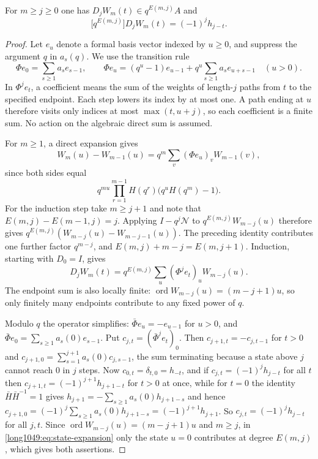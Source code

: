 \begin{lemma}\label{long1049:res:allrowinitial}
For $m\ge j\ge0$ one has $D_jW_m(t)\in q^{E(m,j)}A$ and
\[
 \bigl[q^{E(m,j)}\bigr]D_jW_m(t)=(-1)^{j}h_{j-t}.
\]
\end{lemma}

\begin{proof}
Let $e_u$ denote a formal basis vector indexed by $u\ge0$, and suppress
the argument $q$ in $a_s(q)$. We use the transition rule
\[
 \Phi e_0=\sum_{s\ge1}a_se_{s-1},
 \qquad
 \Phi e_u=(q^{u}-1)e_{u-1}+q^{u}\sum_{s\ge1}a_se_{u+s-1}\quad(u>0).
\]
In $\Phi^je_t$, a coefficient means the sum of the weights of length-$j$
paths from $t$ to the specified endpoint. Each step lowers its index by
at most one. A path ending at $u$ therefore visits only indices at most
$\max(t,u+j)$, so each coefficient is a finite sum. No action on the
algebraic direct sum is assumed.

For $m\ge1$, a direct expansion gives
\[
 W_m(u)-W_{m-1}(u)=q^m\sum_v(\Phi e_u)_vW_{m-1}(v),
\]
since both sides equal
\[
 q^{mu}\prod_{r=1}^{m-1}H(q^r)\bigl(q^uH(q^m)-1\bigr).
\]
For the induction step take $m\ge j+1$ and note that
$E(m,j)-E(m-1,j)=j$. Applying $I-q^j\mathcal N$ to $q^{E(m,j)}W_{m-j}(u)$ therefore gives
$q^{E(m,j)}(W_{m-j}(u)-W_{m-j-1}(u))$.
The preceding identity contributes one further factor $q^{m-j}$, and
$E(m,j)+m-j=E(m,j+1)$. Induction, starting with $D_0=I$, gives
\begin{equation}\label{long1049:eq:state-expansion}
 D_jW_m(t)=q^{E(m,j)}\sum_u(\Phi^{j}e_t)_uW_{m-j}(u).
\end{equation}
The endpoint sum is also locally finite:
$\operatorname{ord}W_{m-j}(u)=(m-j+1)u$, so only finitely many endpoints
contribute to any fixed power of $q$.

Modulo $q$ the operator simplifies: $\bar\Phi e_u=-e_{u-1}$ for $u>0$, and
$\bar\Phi e_0=\sum_{s\ge1}a_s(0)e_{s-1}$.  Put $c_{j,t}=(\bar\Phi^{j}e_t)_0$.
Then $c_{j+1,t}=-c_{j,t-1}$ for $t>0$ and
$c_{j+1,0}=\sum_{s=1}^{j+1}a_s(0)c_{j,s-1}$, the sum terminating because a state
above $j$ cannot reach $0$ in $j$ steps.  Now $c_{0,t}=\delta_{t,0}=h_{-t}$, and
if $c_{j,t}=(-1)^{j}h_{j-t}$ for all $t$ then $c_{j+1,t}=(-1)^{j+1}h_{j+1-t}$ for
$t>0$ at once, while for $t=0$ the identity $\bar H\bar H^{-1}=1$ gives
$h_{j+1}=-\sum_{s\ge1}a_s(0)h_{j+1-s}$ and hence
$c_{j+1,0}=(-1)^{j}\sum_{s\ge1}a_s(0)h_{j+1-s}=(-1)^{j+1}h_{j+1}$.  So
$c_{j,t}=(-1)^{j}h_{j-t}$ for all $j,t$.  Since
$\operatorname{ord}W_{m-j}(u)=(m-j+1)u$ and $m\ge j$, in
\eqref{long1049:eq:state-expansion} only the state $u=0$ contributes at degree $E(m,j)$,
which gives both assertions.
\end{proof}

